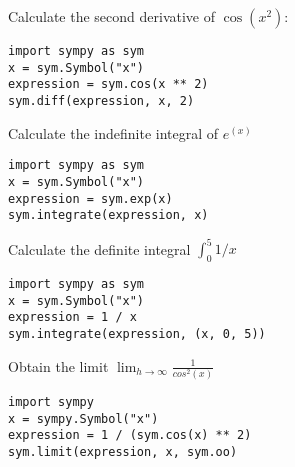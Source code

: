 \documentclass{article}
\begin{document}
\begin{multicols}{2}
    Calculate the second derivative of $\cos(x^2)$:

        \begin{verbatim}
import sympy as sym
x = sym.Symbol("x")
expression = sym.cos(x ** 2)
sym.diff(expression, x, 2)
    \end{verbatim}

        Calculate the indefinite integral of $e^(x)$

        \begin{verbatim}
import sympy as sym
x = sym.Symbol("x")
expression = sym.exp(x)
sym.integrate(expression, x)
        \end{verbatim}

        Calculate the definite integral $\int_0^{5}1/x$

        \begin{verbatim}
import sympy as sym
x = sym.Symbol("x")
expression = 1 / x
sym.integrate(expression, (x, 0, 5))
        \end{verbatim}

        Obtain the limit $\lim_{h \to \infty}\frac{1}{cos^2(x)}$

        \begin{verbatim}
import sympy
x = sympy.Symbol("x")
expression = 1 / (sym.cos(x) ** 2)
sym.limit(expression, x, sym.oo)
        \end{verbatim}
\end{multicols}
\end{document}
